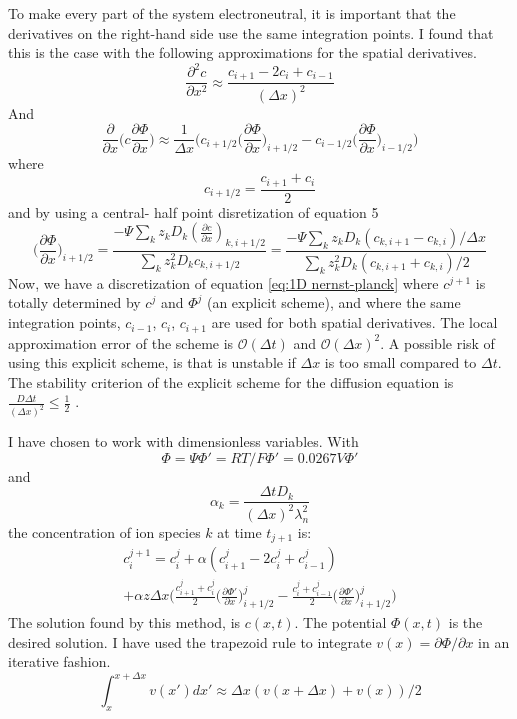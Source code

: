 \documentclass{uiophd}
\begin{document}
To make every part of the system electroneutral, it is important that the derivatives on the right-hand side use the same integration points. I found that this is the case with the following approximations for the spatial derivatives. 
$$\frac{\partial^2 c}{\partial x^2} \approx \frac{c_{i+1}-2c_i+c_{i-1}}{(\Delta x)^2}$$
And 
$$\frac{\partial }{\partial x}  \bigg(c \frac{\partial \Phi}{\partial x} \bigg)\approx \frac{1}{\Delta x}\bigg( c_{i+1/2} \big(\frac{\partial \Phi}{\partial x}\big)_{i+1/2} -  c_{i-1/2} \big(\frac{\partial \Phi}{\partial x}\big)_{i-1/2} \bigg) $$
where 
$$c_{i+ 1/2} = \frac{c_{i+1}+ c_i}{2}$$
and by using a central- half point disretization of equation 5
\begin{equation}\label{eq:gradPhi}
\big(\frac{\partial \Phi}{\partial x}\big)_{i+1/2} = \frac{-\Psi \sum_k z_k D_k (\frac{\partial c}{\partial x})_{k,i+1/2}}{\sum_k z_k^2 D_k c_{k,i+1/2}}= \frac{-\Psi \sum_k z_k D_k (c_{k,i+1}-c_{k,i})/\Delta x }{\sum_k z_k^2 D_k (c_{k,i+1}+c_{k,i})/2}
\end{equation}
Now, we have a discretization of equation \ref{eq:1D nernst-planck} where $c^{j+1}$ is totally determined by $c^j$ and $\Phi^j$ (an explicit scheme), and where the same integration points, $c_{i-1}$, $c_i$, $c_{i+1}$ are used for both spatial derivatives. The local approximation error of the scheme is $\mathcal{O}(\Delta t)$ and $\mathcal{O}(\Delta x)^2$. A possible risk of using this explicit scheme, is that is unstable if $\Delta x$ is too small compared to $\Delta t$. The stability criterion of the explicit scheme for the diffusion equation is $\frac{D\Delta t}{(\Delta x)^2} \leq \frac{1}{2}$ \cite{lecturenotes}.

I have chosen to work with dimensionless variables. With $$\Phi = \Psi\Phi' = RT/F\Phi' = 0.0267V \Phi'$$ and $$\alpha_k = \frac{\Delta t D_k}{(\Delta x)^2 \lambda_n^2}$$ the concentration of ion species $k$ at time $t_{j+1}$ is:
\begin{multline}\label{eq:c_i+1}
 c_i^{j+1}= c_i^j + \alpha(c_{i+1}^j-2c_i^j+c_{i-1}^j)\\ + \alpha z\Delta x \bigg(\frac{c_{i+1}^j+c_i^j}{2} \big(\frac{\partial \Phi'}{\partial x}\big)_{i+1/2}^j-\frac{c_{i}^j+c_{i-1}^j}{2} \big(\frac{\partial \Phi'}{\partial x}\big)_{i+1/2}^j\bigg)
\end{multline}
The solution found by this method, is $c(x,t)$. The potential $\Phi(x,t)$ is the desired solution. I have used the trapezoid rule to integrate $v(x) =\partial \Phi / \partial x$ in an iterative fashion.
\begin{equation}
\int_x^{x+\Delta x}v(x') dx'  \approx \Delta x ( v(x+\Delta x) + v(x) )/2
\end{equation}
\end{document}

